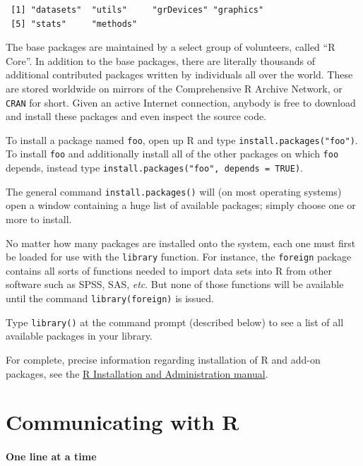 \documentclass[captions=tableheading]{scrbook}
\begin{document}
\begin{verbatim}
 [1] "datasets"  "utils"     "grDevices" "graphics" 
 [5] "stats"     "methods"
\end{verbatim}

The base packages are maintained by a select group of volunteers, called ``\textsf{R} Core''. In addition to the base packages, there are literally thousands of additional contributed packages written by individuals all over the world. These are stored worldwide on mirrors of the Comprehensive \textsf{R} Archive Network, or \texttt{CRAN} for short. Given an active Internet connection, anybody is free to download and install these packages and even inspect the source code.

To install a package named \texttt{foo}, open up \textsf{R} and type \texttt{install.packages("foo")}. To install \texttt{foo} and additionally install all of the other packages on which \texttt{foo} depends, instead type \texttt{install.packages("foo", depends = TRUE)}.

The general command \texttt{install.packages()} will (on most operating systems) open a window containing a huge list of available packages; simply choose one or more to install.

No matter how many packages are installed onto the system, each one must first be loaded for use with the \texttt{library} function. For instance, the \texttt{foreign} package \cite{foreign} contains all sorts of functions needed to import data sets into \textsf{R} from other software such as SPSS, SAS, \emph{etc}. But none of those functions will be available until the command \texttt{library(foreign)} is issued. 

Type \texttt{library()} at the command prompt (described below) to see a list of all available
packages in your library.

For complete, precise information regarding installation of \textsf{R} and add-on packages, see the \href{http://cran.r-project.org/manuals.html}{\textsf{R} Installation and Administration manual}.
\section{Communicating with \textsf{R}}
\label{sec-2-2}

\label{sec:Communicating-with-R}

\paragraph*{One line at a time}
\end{document}
